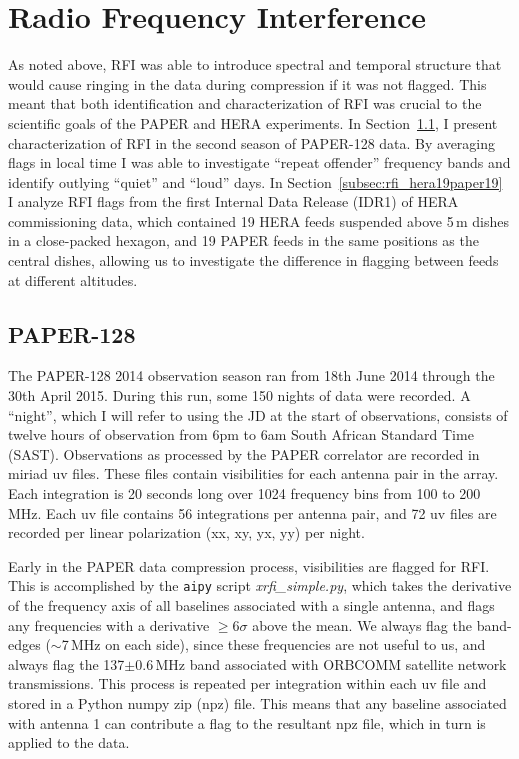 \section{Radio Frequency Interference}
\label{sec:RFI}

As noted above, RFI was able to introduce spectral and temporal structure that would cause ringing in the data during compression if it was not flagged. This meant that both identification and characterization of RFI was crucial to the scientific goals of the PAPER and HERA experiments. In Section~\ref{subsec:rfi_paper128}, I present characterization of RFI in the second season of PAPER-128 data. By averaging flags in local time I was able to investigate ``repeat offender'' frequency bands and identify outlying ``quiet'' and ``loud'' days.
In Section~\ref{subsec:rfi_hera19paper19} I analyze RFI flags from the first Internal Data Release (IDR1) of HERA commissioning data, which contained 19 HERA feeds suspended above 5\,m dishes in a close-packed hexagon, and 19 PAPER feeds in the same positions as the central dishes, allowing us to investigate the difference in flagging between feeds at different altitudes.

\subsection{PAPER-128}
\label{subsec:rfi_paper128}

The PAPER-128 2014 observation season ran from 18th June 2014 through the 30th April 2015. During this run, some 150 nights of data were recorded. A ``night'', which I will refer to using the JD at the start of observations, consists of twelve hours of observation from 6pm to 6am South African Standard Time (SAST). Observations as processed by the PAPER correlator are recorded in {\sc miriad} uv files. These files contain visibilities for each antenna pair in the array. Each integration is 20 seconds long over 1024 frequency bins from 100 to 200\,MHz. Each uv file contains 56 integrations per antenna pair, and 72 uv files are recorded per linear polarization (xx, xy, yx, yy) per night.

Early in the PAPER data compression process, visibilities are flagged for RFI. This is accomplished by the {\tt aipy} script \textit{xrfi\_simple.py}, which takes the derivative of the frequency axis of all baselines associated with a single antenna, and flags any frequencies with a derivative $\geqslant 6\sigma$ above the mean. We always flag the band-edges ($\sim$7\,MHz on each side), since these frequencies are not useful to us, and always flag the 137$\pm$0.6\,MHz band associated with ORBCOMM satellite network transmissions. This process is repeated per integration within each uv file and stored in a Python numpy zip (npz) file. This means that any baseline associated with antenna 1 can contribute a flag to the resultant npz file, which in turn is applied to the data.

